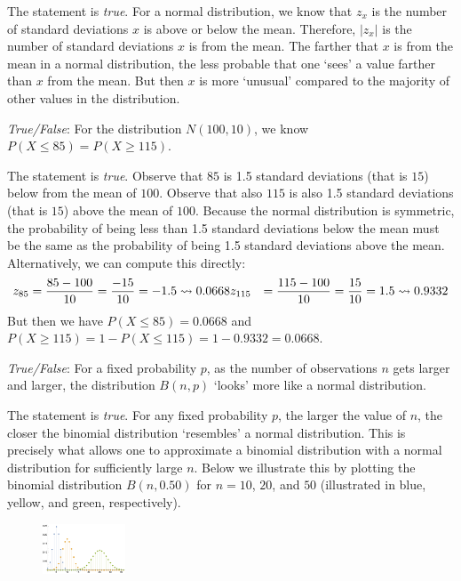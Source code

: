 \documentclass[11pt,letterpaper]{article}
\begin{document}
\sol The statement is \textit{true}. For a normal distribution, we know that $z_x$ is the number of standard deviations $x$ is above or below the mean. Therefore, $|z_x|$ is the number of standard deviations $x$ is from the mean. The farther that $x$ is from the mean in a normal distribution, the less probable that one `sees' a value farther than $x$ from the mean. But then $x$ is more `unusual' compared to the majority of other values in the distribution. \pvspace{1.3cm} 



\quizsol \textit{True/False}: For the distribution $N(100, 10)$, we know $P(X \leq 85)= P(X \geq 115)$. \pspace

\sol The statement is \textit{true}. Observe that $85$ is 1.5 standard deviations (that is $15$) below from the mean of $100$. Observe that also $115$ is also 1.5 standard deviations (that is $15$) above the mean of $100$. Because the normal distribution is symmetric, the probability of being less than 1.5 standard deviations below the mean must be the same as the probability of being 1.5 standard deviations above the mean. Alternatively, we can compute this directly:
	\[
	\begin{aligned}
	z_{85}&= \dfrac{85 - 100}{10}= \dfrac{-15}{10}= -1.5 \rightsquigarrow 0.0668
	z_{115}&= \dfrac{115 - 100}{10}= \dfrac{15}{10}= 1.5 \rightsquigarrow 0.9332
	\end{aligned}
	\]
But then we have $P(X \leq 85)= 0.0668$ and $P(X \geq 115)= 1 - P(X \leq 115)= 1 - 0.9332= 0.0668$. \pvspace{1.3cm}



\quizsol \textit{True/False}: For a fixed probability $p$, as the number of observations $n$ gets larger and larger, the distribution $B(n, p)$ `looks' more like a normal distribution. \pspace

\sol The statement is \textit{true}. For any fixed probability $p$, the larger the value of $n$, the closer the binomial distribution `resembles' a normal distribution. This is precisely what allows one to approximate a binomial distribution with a normal distribution for sufficiently large $n$. Below we illustrate this by plotting the binomial distribution $B(n, 0.50)$ for $n= 10$, $20$, and $50$ (illustrated in blue, yellow, and green, respectively). 
	\begin{figure}[!ht]
	\centering
	\includegraphics[width= 0.22\textwidth]{binomial.png}
	\end{figure}
\end{document}
